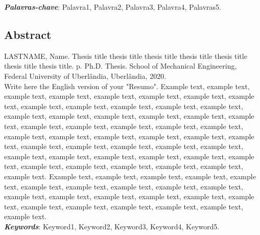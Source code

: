 \noindent
\emph{\textbf{Palavras-chave}}: Palavra1, Palavra2, Palavra3, Palavra4, Palavras5.\\
\clearpage
\begin{center}
	\chapter*{Abstract}
\end{center}
\vspace{24pt}
\noindent
LASTNAME, Name. Thesis title thesis title thesis title thesis title thesis title thesis title thesis title. \pageref{LastPage}p. Ph.D. Thesis. School of Mechanical Engineering, Federal University of Uberlândia, Uberlândia, 2020.\\

Write here the English version of your "Resumo". Example text, example text, example text, example text, example text, example text, example text, example text, example text, example text, example text, example text, example text, example text, example text, example text, example text, example text, example text, example text, example text, example text, example text, example text, example text, example text, example text, example text, example text, example text, example text, example text, example text, example text, example text, example text, example text, example text, example text, example text, example text, example text, example text, example text, example text, example text, example text. Example text, example text, example text, example text, example text, example text, example text, example text, example text, example text, example text, example text, example text, example text, example text, example text, example text, example text, example text, example text, example text, example text.
\\

\noindent
\emph{\textbf{Keywords}}: Keyword1, Keyword2, Keyword3, Keyword4, Keyword5.